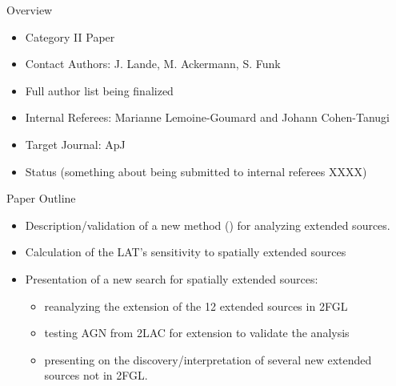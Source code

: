 \fermititle

\begin{frame}{Overview}
  \begin{itemize}
    \item Category II Paper
    \item Contact Authors: J. Lande, M. Ackermann, S. Funk
    \item Full author list being finalized
    \item Internal Referees: Marianne Lemoine-Goumard and Johann Cohen-Tanugi
    \item Target Journal: ApJ
    \item Status (something about being submitted to internal referees XXXX)
  \end{itemize}
\end{frame}

\begin{frame}{Paper Outline}
  \begin{itemize}
    \item Description/validation of a new method (\pointlike) for analyzing extended sources.
    \item  Calculation of the LAT's sensitivity to spatially extended sources
    \item  Presentation of a new search for spatially extended sources:
      \begin{itemize}
        \item reanalyzing the extension of the 12 extended sources in 2FGL
        \item testing AGN from 2LAC for extension to validate the analysis
        \item presenting on the discovery/interpretation of several new extended sources not in 2FGL.
      \end{itemize}
  \end{itemize}
\end{frame}

